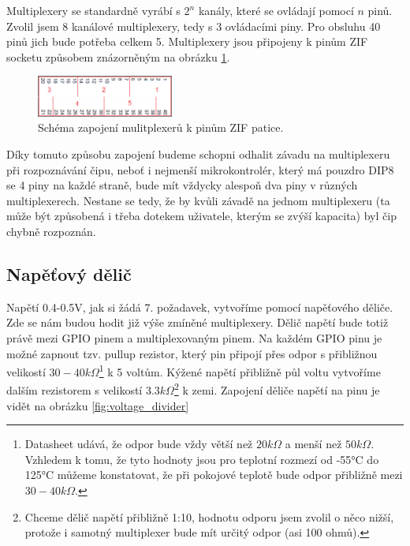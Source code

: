 \documentclass[11pt,a4paper,twoside,openright]{report}
\begin{document}

Multiplexery se standardně vyrábí s $2^n$ kanály, které se ovládají pomocí $n$ pinů. Zvolil jsem 8 kanálové multiplexery\cite{multiplexer}, tedy s 3 ovládacími piny. Pro obsluhu 40 pinů jich bude potřeba celkem 5. Multiplexery jsou připojeny k pinům ZIF socketu způsobem znázorněným na obrázku \ref{fig:mux_diagram}.

\begin{figure}[ht!]
  \includegraphics[width=0.4\textwidth]{img/mux_diagram.png}
  \centering
  \caption{Schéma zapojení mulitplexerů k pinům ZIF patice.}
  \label{fig:mux_diagram}
\end{figure}

Díky tomuto způsobu zapojení budeme schopni odhalit závadu na multiplexeru při rozpoznávání čipu, neboť i nejmenší mikrokontrolér, který má pouzdro DIP8 se 4 piny na každé straně, bude mít vždycky alespoň dva piny v různých multiplexerech. Nestane se tedy, že by kvůli závadě na jednom multiplexeru (ta může být způsobená i třeba dotekem uživatele, kterým se zvýší kapacita) byl čip chybně rozpoznán.

\subsection {Napěťový dělič \label{voltage_divider}}

Napětí 0.4-0.5V, jak si žádá 7. požadavek, vytvoříme pomocí napěťového děliče. Zde se nám budou hodit již výše zmíněné multiplexery. Dělič napětí bude totiž právě mezi GPIO pinem a multiplexovaným pinem. Na každém GPIO pinu je možné zapnout tzv. pullup rezistor, který pin připojí přes odpor s přibližnou velikostí $30-40k\Omega$\footnote{Datasheet udává, že odpor bude vždy větší než $20k\Omega$ a menší než $50k\Omega$. Vzhledem k tomu, že tyto hodnoty jsou pro teplotní rozmezí od -55°C do 125°C můžeme konstatovat, že při pokojové teplotě bude odpor přibližně mezi $30-40k\Omega$.} k 5 voltům. Kýžené napětí přibližně půl voltu vytvoříme dalším rezistorem s velikostí $3.3k\Omega$\footnote{Chceme dělič napětí přibližně 1:10, hodnotu odporu jsem zvolil o něco nižší, protože i samotný multiplexer bude mít určitý odpor (asi 100 ohmů).} k zemi. Zapojení děliče napětí na pinu je vidět na obrázku \ref{fig:voltage_divider}
\end{document}
